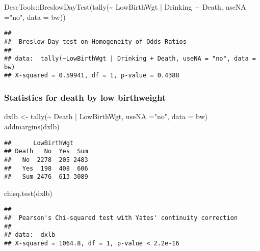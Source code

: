 \documentclass[
]{article}
\newenvironment{Shaded}{\begin{snugshade}}{\end{snugshade}}
\newcommand{\AttributeTok}[1]{\textcolor[rgb]{0.77,0.63,0.00}{#1}}
\newcommand{\FunctionTok}[1]{\textcolor[rgb]{0.00,0.00,0.00}{#1}}
\newcommand{\NormalTok}[1]{#1}
\newcommand{\OtherTok}[1]{\textcolor[rgb]{0.56,0.35,0.01}{#1}}
\newcommand{\SpecialCharTok}[1]{\textcolor[rgb]{0.00,0.00,0.00}{#1}}
\newcommand{\StringTok}[1]{\textcolor[rgb]{0.31,0.60,0.02}{#1}}
\begin{document}
\begin{Shaded}
\begin{Highlighting}[]
\NormalTok{DescTools}\SpecialCharTok{::}\FunctionTok{BreslowDayTest}\NormalTok{(}\FunctionTok{tally}\NormalTok{(}\SpecialCharTok{\textasciitilde{}}\NormalTok{ LowBirthWgt }\SpecialCharTok{|}\NormalTok{ Drinking }\SpecialCharTok{+}\NormalTok{ Death, }\AttributeTok{useNA =}\StringTok{"no"}\NormalTok{, }\AttributeTok{data =}\NormalTok{ bw))}
\end{Highlighting}
\end{Shaded}

\begin{verbatim}
## 
##  Breslow-Day test on Homogeneity of Odds Ratios
## 
## data:  tally(~LowBirthWgt | Drinking + Death, useNA = "no", data = bw)
## X-squared = 0.59941, df = 1, p-value = 0.4388
\end{verbatim}

\hypertarget{statistics-for-death-by-low-birthweight}{%
\subsubsection{Statistics for death by low
birthweight}\label{statistics-for-death-by-low-birthweight}}

\begin{Shaded}
\begin{Highlighting}[]
\NormalTok{dxlb }\OtherTok{\textless{}{-}} \FunctionTok{tally}\NormalTok{(}\SpecialCharTok{\textasciitilde{}}\NormalTok{ Death }\SpecialCharTok{|}\NormalTok{ LowBirthWgt, }\AttributeTok{useNA =}\StringTok{"no"}\NormalTok{, }\AttributeTok{data =}\NormalTok{ bw)}
\FunctionTok{addmargins}\NormalTok{(dxlb)}
\end{Highlighting}
\end{Shaded}

\begin{verbatim}
##      LowBirthWgt
## Death   No  Yes  Sum
##   No  2278  205 2483
##   Yes  198  408  606
##   Sum 2476  613 3089
\end{verbatim}

\begin{Shaded}
\begin{Highlighting}[]
\FunctionTok{chisq.test}\NormalTok{(dxlb)}
\end{Highlighting}
\end{Shaded}

\begin{verbatim}
## 
##  Pearson's Chi-squared test with Yates' continuity correction
## 
## data:  dxlb
## X-squared = 1064.8, df = 1, p-value < 2.2e-16
\end{verbatim}
\end{document}
